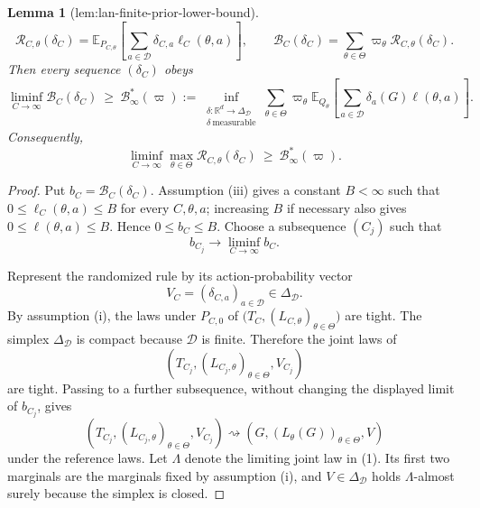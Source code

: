 \documentclass{article}
\newtheorem{lemma}{Lemma}
\begin{document}
\begin{lemma}[lem:lan-finite-prior-lower-bound]
\[
 \mathcal R_{C,\theta}(\delta_C)
 =\mathbb E_{P_{C,\theta}}\!\left[
   \sum_{a\in\mathcal D}\delta_{C,a}\ell_C(\theta,a)
 \right],
 \qquad
 \mathcal B_C(\delta_C)=\sum_{\theta\in\Theta}\varpi_\theta
 \mathcal R_{C,\theta}(\delta_C).
\]
Then every sequence \((\delta_C)\) obeys
\[
 \liminf_{C\to\infty}\mathcal B_C(\delta_C)
 \ \geq\ 
 \mathcal B_\infty^*(\varpi)
 :=\inf_{\substack{\delta\colon\mathbb R^d\to\Delta_{\mathcal D}\\
                    \delta\ \mathrm{measurable}}}
 \sum_{\theta\in\Theta}\varpi_\theta
 \mathbb E_{Q_\theta}\!\left[
   \sum_{a\in\mathcal D}\delta_a(G)\ell(\theta,a)
 \right].
\]
Consequently,
\[
 \liminf_{C\to\infty}\max_{\theta\in\Theta}
 \mathcal R_{C,\theta}(\delta_C)
 \ \geq\ \mathcal B_\infty^*(\varpi).
\]
\end{lemma}
\begin{proof}
Put \(b_C=\mathcal B_C(\delta_C)\).  Assumption (iii) gives a constant \(B<\infty\) such that \(0\leq\ell_C(\theta,a)\leq B\) for every \(C,\theta,a\); increasing \(B\) if necessary also gives \(0\leq\ell(\theta,a)\leq B\).  Hence \(0\leq b_C\leq B\).  Choose a subsequence \((C_j)\) such that
\[
 b_{C_j}\longrightarrow\liminf_{C\to\infty}b_C.
\]

Represent the randomized rule by its action-probability vector
\[
 V_C=(\delta_{C,a})_{a\in\mathcal D}\in\Delta_{\mathcal D}.
\]
By assumption (i), the laws under \(P_{C,0}\) of
\(\bigl(T_C,(L_{C,\theta})_{\theta\in\Theta}\bigr)\) are tight.  The simplex \(\Delta_{\mathcal D}\) is compact because \(\mathcal D\) is finite.  Therefore the joint laws of
\[
 \left(T_{C_j},(L_{C_j,\theta})_{\theta\in\Theta},V_{C_j}\right)
\]
are tight.  Passing to a further subsequence, without changing the displayed limit of \(b_{C_j}\), gives
\[
 \left(T_{C_j},(L_{C_j,\theta})_{\theta\in\Theta},V_{C_j}\right)
 \rightsquigarrow
 \left(G,(L_\theta(G))_{\theta\in\Theta},V\right)
 \tag{1}
\]
under the reference laws.  Let \(\Lambda\) denote the limiting joint law in (1).  Its first two marginals are the marginals fixed by assumption (i), and \(V\in\Delta_{\mathcal D}\) holds \(\Lambda\)-almost surely because the simplex is closed.


\end{proof}
\end{document}
